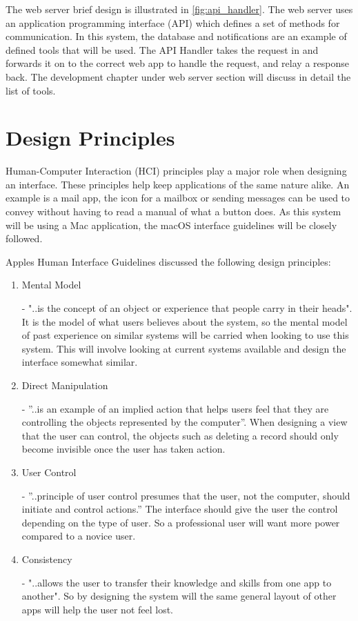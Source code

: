 The web server brief design is illustrated in \ref{fig:api_handler}. The web server uses an application programming interface (API) which defines a set of methods for communication. In this system, the database and notifications are an example of defined tools that will be used. The API Handler takes the request in and forwards it on to the correct web app to handle the request, and relay a response back. The development chapter under web server section will discuss in detail the list of tools.


\section{Design Principles}

Human-Computer Interaction (HCI) principles play a major role when designing an interface. These principles help keep applications of the same nature alike. An example is a mail app, the icon for a mailbox or sending messages can be used to convey without having to read a manual of what a button does. As this system will be using a Mac application, the macOS interface guidelines will be closely followed.

Apples Human Interface Guidelines \cite{guidelines} discussed the following design principles:

\begin{enumerate}
  \item Mental Model 
  
  - "..is the concept of an object or experience that people carry in their heads". It is the model of what users believes about the system, so the mental model of past experience on similar systems will be carried when looking to use this system. This will involve looking at current systems available and design the interface somewhat similar.
  
  \item Direct Manipulation
  
  - ”..is an example of an implied action that helps users feel that they are controlling the objects represented by the computer”. When designing a view that the user can control, the objects such as deleting a record should only become invisible once the user has taken action.
  
  \item User Control 
  
  - ”..principle of user control presumes that the user, not the computer, should initiate and control actions.” The interface should give the user the control depending on the type of user. So a professional user will want more power compared to a novice user.
  
  \item Consistency
  
  - "..allows the user to transfer their knowledge and skills from one app to another". So by designing the system will the same general layout of other apps will help the user not feel lost.
  
\end{enumerate}